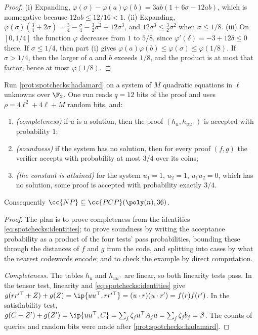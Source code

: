 \begin{refsection}
\begin{proof}
(i) Expanding, $\varphi(\sigma)-\varphi(a)\varphi(b)=3ab(1+6\sigma-12ab)$, which is nonnegative because $12ab\le12/16<1$. (ii) Expanding, $\varphi(\sigma)(\frac34+2\sigma)=\frac34-\frac\sigma4-\frac32\sigma^2+12\sigma^3$, and $12\sigma^3\le\frac32\sigma^2$ when $\sigma\le1/8$. (iii) On $[0,1/4]$ the function $\varphi$ decreases from $1$ to $5/8$, since $\varphi'(\delta)=-3+12\delta\le0$ there. If $\sigma\le1/4$, then part (i) gives $\varphi(a)\varphi(b)\le\varphi(\sigma)\le\varphi(1/8)$. If $\sigma>1/4$, then the larger of $a$ and $b$ exceeds $1/8$, and the product is at most that factor, hence at most $\varphi(1/8)$.
\end{proof}

\begin{theorem}\label{thm:spotchecks:hadamardpcp}
Run \cref{prot:spotchecks:hadamard} on a system of $M$ quadratic equations in $\ell$ unknowns over $\F_2$. One run reads $q=12$ bits of the proof and uses $\rho=4\ell^2+4\ell+M$ random bits, and:
\begin{enumerate}
\item \emph{(completeness)} if $u$ is a solution, then the proof $(h_u,h_{uu^\top})$ is accepted with probability $1$;
\item \emph{(soundness)} if the system has no solution, then for every proof $(f,g)$ the verifier accepts with probability at most $3/4$ over its coins;
\item \emph{(the constant is attained)} for the system $u_1=1$, $u_2=1$, $u_1u_2=0$, which has no solution, some proof is accepted with probability exactly $3/4$.
\end{enumerate}
Consequently $\cc{NP}\subseteq\cc{PCP}(\poly(n),36)$.
\end{theorem}

\begin{proof}
The plan is to prove completeness from the identities \eqref{eq:spotchecks:identities}; to prove soundness by writing the acceptance probability as a product of the four tests' pass probabilities, bounding these through the distances of $f$ and $g$ from the code, and splitting into cases by what the nearest codewords encode; and to check the example by direct computation.

\emph{Completeness.} The tables $h_u$ and $h_{uu^\top}$ are linear, so both linearity tests pass. In the tensor test, linearity and \eqref{eq:spotchecks:identities} give $g(rr'^\top+Z)+g(Z)=\ip{uu^\top,rr'^\top}=(u\cdot r)(u\cdot r')=f(r)f(r')$. In the satisfiability test, $g(C+Z')+g(Z')=\ip{uu^\top,C}=\sum_j\zeta_ju^\top A_ju=\sum_j\zeta_jb_j=\beta$. The counts of queries and random bits were made after \cref{prot:spotchecks:hadamard}.


\end{proof}
\end{refsection}

